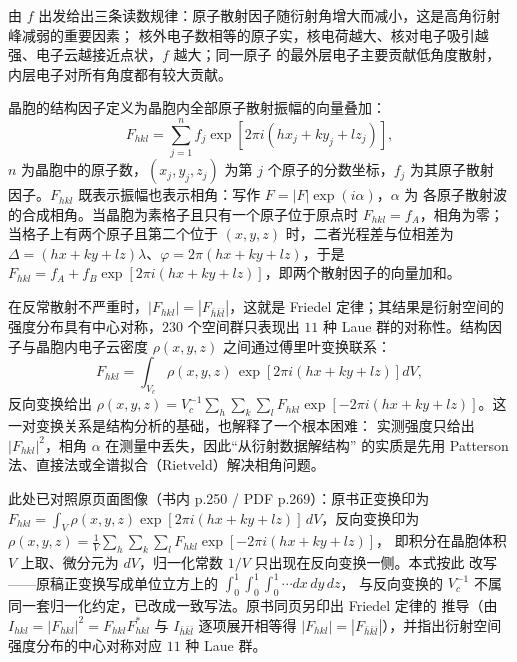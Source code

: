 由 $f$ 出发给出三条读数规律：原子散射因子随衍射角增大而减小，这是高角衍射峰减弱的重要因素；
核外电子数相等的原子实，核电荷越大、核对电子吸引越强、电子云越接近点状，$f$ 越大；同一原子
的最外层电子主要贡献低角度散射，内层电子对所有角度都有较大贡献。

晶胞的结构因子定义为晶胞内全部原子散射振幅的向量叠加：
\begin{equation}
F_{hkl}=\sum_{j=1}^{n}f_{j}\exp\!\left[2\pi i\left(hx_{j}+ky_{j}+lz_{j}\right)\right],
\label{eq:ch04b-F}
\end{equation}
$n$ 为晶胞中的原子数，$(x_{j},y_{j},z_{j})$ 为第 $j$ 个原子的分数坐标，$f_{j}$ 为其原子散射
因子。$F_{hkl}$ 既表示振幅也表示相角：写作 $F=\left|F\right|\exp(i\alpha)$，$\alpha$ 为
各原子散射波的合成相角。当晶胞为素格子且只有一个原子位于原点时 $F_{hkl}=f_{A}$，相角为零；
当格子上有两个原子且第二个位于 $(x,y,z)$ 时，二者光程差与位相差为
$\Delta=(hx+ky+lz)\lambda$、$\varphi=2\pi(hx+ky+lz)$，于是
$F_{hkl}=f_{A}+f_{B}\exp\!\left[2\pi i(hx+ky+lz)\right]$，即两个散射因子的向量加和。

在反常散射不严重时，$\left|F_{hkl}\right|=\left|F_{\bar{h}\bar{k}\bar{l}}\right|$，这就是
Friedel 定律；其结果是衍射空间的强度分布具有中心对称，$230$ 个空间群只表现出 $11$ 种
Laue 群的对称性。结构因子与晶胞内电子云密度 $\rho(x,y,z)$ 之间通过傅里叶变换联系：
\begin{equation}
F_{hkl}=\int_{V_{c}}\rho(x,y,z)\,
\exp\!\left[2\pi i(hx+ky+lz)\right]dV ,
\label{eq:ch04b-FT}
\end{equation}
反向变换给出 $\rho(x,y,z)=V_{c}^{-1}\sum_{h}\sum_{k}\sum_{l}F_{hkl}
\exp\!\left[-2\pi i(hx+ky+lz)\right]$。这一对变换关系是结构分析的基础，也解释了一个根本困难：
实测强度只给出 $\left|F_{hkl}\right|^{2}$，相角 $\alpha$ 在测量中丢失，因此“从衍射数据解结构”
的实质是先用 Patterson 法、直接法或全谱拟合（Rietveld）解决相角问题。

此处已对照原页面图像（书内 p.250 / PDF p.269）：原书正变换印为
$F_{hkl}=\int_{V}\rho(x,y,z)\exp[2\pi i(hx+ky+lz)]\,dV$，反向变换印为
$\rho(x,y,z)=\frac{1}{V}\sum_{h}\sum_{k}\sum_{l}F_{hkl}\exp[-2\pi i(hx+ky+lz)]$，
即积分在晶胞体积 $V$ 上取、微分元为 $dV$，归一化常数 $1/V$ 只出现在反向变换一侧。本式按此
改写——原稿正变换写成单位立方上的 $\int_{0}^{1}\!\!\int_{0}^{1}\!\!\int_{0}^{1}\cdots dx\,dy\,dz$，
与反向变换的 $V_{c}^{-1}$ 不属同一套归一化约定，已改成一致写法。原书同页另印出 Friedel 定律的
推导（由 $I_{hkl}=\left|F_{hkl}\right|^{2}=F_{hkl}F_{hkl}^{*}$ 与 $I_{\bar{h}\bar{k}\bar{l}}$
逐项展开相等得 $\left|F_{hkl}\right|=\left|F_{\bar{h}\bar{k}\bar{l}}\right|$），并指出衍射空间
强度分布的中心对称对应 $11$ 种 Laue 群。

